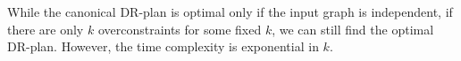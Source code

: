 





\begin{remark}
    While the canonical DR-plan is optimal only if the input graph is independent, if there are only $k$ overconstraints for some fixed $k$, we can still find the optimal DR-plan. However, the time complexity is exponential in $k$.
\end{remark}

